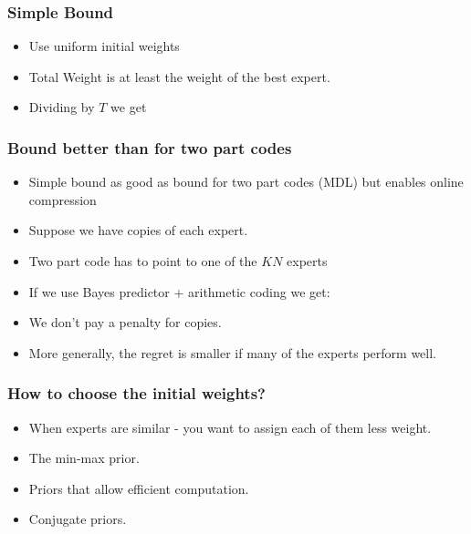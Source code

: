 \documentclass[handout]{beamer}
\begin{document}
\begin{frame}
\frametitle{Simple Bound}
\begin{itemize}
\item Use uniform initial weights 
\item Total Weight is at least the weight of the best expert.
\item Dividing by $T$ we get
\end{itemize}
\end{frame}



\begin{frame}
\frametitle{Bound better than for two part codes}
\begin{itemize}
\item
Simple bound as good as bound for two part codes (MDL) 
but enables online compression
\item Suppose we have  copies of each expert.
\item Two part code has to point to one of the $KN$ experts
\item If we use Bayes predictor + arithmetic coding we get:
\item We don't pay a penalty for copies.
\item More generally, the regret is smaller if many of the experts perform well.
\end{itemize}
\end{frame}

\begin{frame}
\frametitle{How to choose the initial weights?}
\begin{itemize}
\item When experts are similar - you want to assign each of them less
  weight.
\item The min-max prior.
\item Priors that allow efficient computation.
\item Conjugate priors.
\end{itemize}
\end{frame}
\end{document}
